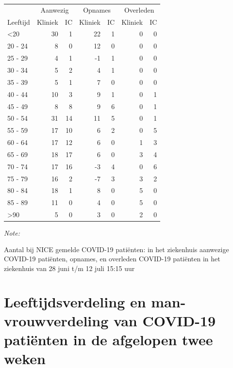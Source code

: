 \documentclass[
  english,
  man,floatsintext]{apa6}
\begin{document}
\begin{table}
\centering\begingroup\fontsize{10}{12}\selectfont

\begin{threeparttable}
\begin{tabular}{lrrrrrr}
\toprule
\multicolumn{1}{c}{ } & \multicolumn{2}{c}{Aanwezig} & \multicolumn{2}{c}{Opnames} & \multicolumn{2}{c}{Overleden} \\
\cmidrule(l{3pt}r{3pt}){2-3} \cmidrule(l{3pt}r{3pt}){4-5} \cmidrule(l{3pt}r{3pt}){6-7}
Leeftijd & Kliniek & IC & Kliniek & IC & Kliniek & IC\\
\midrule
<20 & 30 & 1 & 22 & 1 & 0 & 0\\
20 - 24 & 8 & 0 & 12 & 0 & 0 & 0\\
25 - 29 & 4 & 1 & -1 & 1 & 0 & 0\\
30 - 34 & 5 & 2 & 4 & 1 & 0 & 0\\
35 - 39 & 5 & 1 & 7 & 0 & 0 & 0\\
40 - 44 & 10 & 3 & 9 & 1 & 0 & 1\\
45 - 49 & 8 & 8 & 9 & 6 & 0 & 1\\
50 - 54 & 31 & 14 & 11 & 5 & 0 & 1\\
55 - 59 & 17 & 10 & 6 & 2 & 0 & 5\\
60 - 64 & 17 & 12 & 6 & 0 & 1 & 3\\
65 - 69 & 18 & 17 & 6 & 0 & 3 & 4\\
70 - 74 & 17 & 16 & -3 & 4 & 0 & 6\\
75 - 79 & 16 & 2 & -7 & 3 & 3 & 2\\
80 - 84 & 18 & 1 & 8 & 0 & 5 & 0\\
85 - 89 & 11 & 0 & 4 & 0 & 5 & 0\\
>90 & 5 & 0 & 3 & 0 & 2 & 0\\
\bottomrule
\end{tabular}
\begin{tablenotes}
\item \textit{Note: } 
\item Aantal bij NICE gemelde COVID-19 patiënten: in het ziekenhuis aanwezige COVID-19 patiënten, opnames, en overleden COVID-19 patiënten in het ziekenhuis van 28 juni t/m 12 juli 15:15 uur
\end{tablenotes}
\end{threeparttable}
\endgroup{}
\end{table}

\newpage

\hypertarget{leeftijdsverdeling-en-man-vrouwverdeling-van-covid-19-patiuxebnten-in-de-afgelopen-twee-weken}{%
\section{Leeftijdsverdeling en man-vrouwverdeling van COVID-19 patiënten in de afgelopen twee weken}\label{leeftijdsverdeling-en-man-vrouwverdeling-van-covid-19-patiuxebnten-in-de-afgelopen-twee-weken}}
\end{document}
